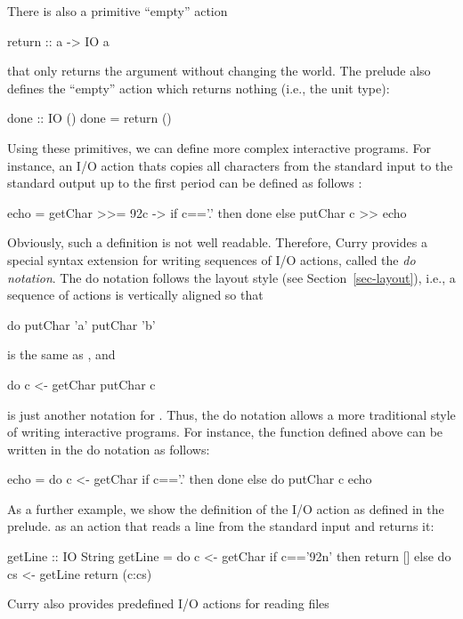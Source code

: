 There is also a primitive ``empty'' action
\begin{prog}
return :: a -> IO a
\end{prog}
that only returns the argument without changing the world.
The prelude also defines the ``empty'' action
which returns nothing (i.e., the unit type):
\begin{prog}
done :: IO ()
done = return ()
\end{prog}
%
Using these primitives, we can define more complex interactive programs.
For instance, an I/O action thats copies all characters from
the standard input to the standard output up to the first period
can be defined as follows
:
\begin{prog}
echo = getChar >>= \char92c -> if c=='.' then done else putChar c >> echo
\end{prog}
%
Obviously, such a definition is not well readable.
Therefore, Curry provides a special syntax extension for
writing sequences of I/O actions, called the
\emph{do notation}.
The do notation follows the layout style
(see Section~\ref{sec-layout}), i.e., a sequence of actions
is vertically aligned so that
\begin{prog}
do putChar 'a'
   putChar 'b'
\end{prog}
is the same as , and
\begin{prog}
do c <- getChar
   putChar c
\end{prog}
is just another notation for .
Thus, the do notation allows a more traditional style of writing
interactive programs. For instance, the function 
defined above can be written in the do notation as follows:
\begin{prog}
echo = do c <- getChar
          if c=='.'
            then done
            else do putChar c
                    echo
\end{prog}
As a further example, we show the definition of the I/O action
 as defined in the prelude.
 as an action that reads a line from the standard input
and returns it:
\begin{prog}
getLine :: IO String
getLine = do c <- getChar
             if c=='\char92n'
                then return []
                else do cs <- getLine
                        return (c:cs)
\end{prog}
Curry also provides predefined I/O actions for reading files
